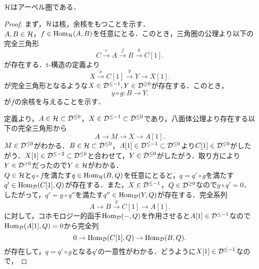 \begin{prop}\cite[p.33]{BBD}
	${\mathcal H}$はアーベル圏である．
\end{prop}
\begin{proof}
	まず，${\mathcal H}$は核，余核をもつことを示す．\\
	$A,B\in{\mathcal H}$，$f\in\operatorname{\mathrm{Hom}}_{{\mathcal H}}(A,B)$を任意にとる．このとき，三角圏の公理より以下の完全三角形
	\[C\xrightarrow{e}A\xrightarrow{f}B\xrightarrow{g}C[1].\]
	が存在する．t-構造の定義より
	\[X\xrightarrow{x}C[1]\xrightarrow{y}Y\rightarrow X[1].\]
	が完全三角形となるような$X\in {\mathcal D}^{\le -1},Y\in {\mathcal D}^{\ge 0}$が存在する．このとき，
	\[y\circ g\colon B\rightarrow Y.\]
	が$f$の余核を与えることを示す．
	\begin{comment}
			\[
				\begin{tikzcd}[column sep=huge,row sep =huge]
					B[-1] \ar[r,"g\texttt{[-1]}"]\ar[d,equal]& C\ar[r,]\ar[d,"y\texttt{[-1]}",swap]& A\ar[d,"\ell",dotted] \ar[r,"f"]& B\ar[d,equal]\\
					B[-1] \ar[r,"y\texttt{[-1]}\circ g\texttt{[-1]}"]\ar[d,"g\texttt{[-1]}",swap]& Y[-1]\ar[r,]\ar[d,equal]& M\ar[d,dotted] \ar[r,"m"]& B\ar[d,"g"]\\
					C \ar[r,]\ar[d,swap]& Y[-1]\ar[r,]\ar[d,swap]& X \ar[r,"x"]\ar[d,equal]& C[1] \ar[d,]\\
			A \ar[r,"\ell",dotted]& M\ar[r,dotted]&  X\ar[r,dotted]& A[1]\\
		\end{tikzcd}
			\]
\end{comment}	
			定義より，$A\in{\mathcal H}\subset{\mathcal D}^{\le 0}$，$X\in{\mathcal D}^{\le -1}\subset{\mathcal D}^{\le 0}$であり，八面体公理より存在する以下の完全三角形から
	\[A\rightarrow M\rightarrow X\rightarrow A[1].\]
	$M\in{\mathcal D}^{\le 0}$がわかる．$B\in{\mathcal H}\subset{\mathcal D}^{\le 0}$，$A[1]\in {\mathcal D}^{\le -1}\subset {\mathcal D}^{\le 0}$より$C[1]\in{\mathcal D}^{\le 0}$がしたがう．$X[1]\in{\mathcal D}^{\le -2}\subset{\mathcal D}^{\le 0}$と合わせて，$Y\in{\mathcal D}^{\le 0}$がしたがう．取り方により$Y\in{\mathcal D}^{\ge 0}$だったので$Y\in{\mathcal H}$がわかる．\\
	$Q\in{\mathcal H}$と$q\circ f$を満たす$q\in\operatorname{\mathrm{Hom}}_{{\mathcal H}}(B,Q)$を任意にとると，$q=q'\circ g$を満たす$q'\in\operatorname{\mathrm{Hom}}_{{\mathcal D}}(C[1],Q)$が存在する．また，$X\in{\mathcal D}^{\le -1}$，$Q\in{\mathcal D}^{\ge 0}$なので$g\circ q'=0$．したがって，$q'=y\circ q''$を満たす$q''\in\operatorname{\mathrm{Hom}}_{{\mathcal D}}(Y,Q)$が存在する．完全系列
	\[A\rightarrow B\xrightarrow{g} C[1]\rightarrow A[1].\]
	に対して，コホモロジー的函手$\operatorname{\mathrm{Hom}}_{{\mathcal D}}(-,Q)$を作用させると$A[1]\in{\mathcal D}^{\le -1}$なので$\operatorname{\mathrm{Hom}}_{{\mathcal D}}(A[1],Q)=0$から完全列
	\[0\rightarrow \operatorname{\mathrm{Hom}}_{{\mathcal D}}(C[1],Q) \rightarrow \operatorname{\mathrm{Hom}}_{{\mathcal D}}(B,Q).\]
	が存在して，$q=q'\circ g$となる$q'$の一意性がわかる．どうように$X[1]\in{\mathcal D}^{\le -1}$なので，

\end{proof}
